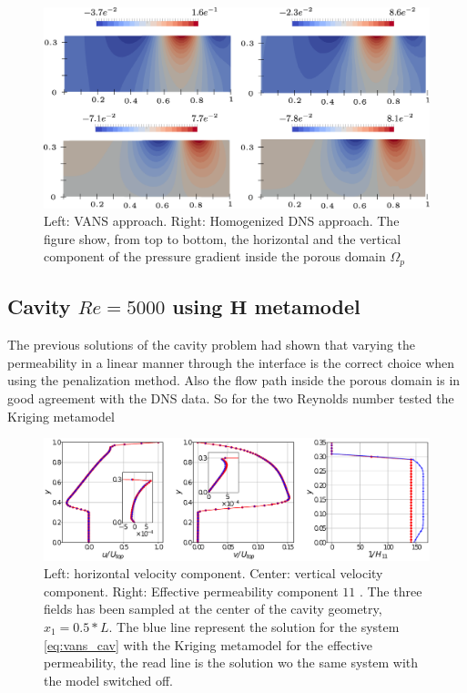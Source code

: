 \begin{figure}[h]
	\centering
	\includegraphics[width=1\linewidth]{chapter_5/figure/re1000/vans_p}
	\caption{Left: VANS approach. Right: Homogenized DNS approach. The figure show, from top to bottom, the horizontal and the vertical component of the pressure gradient inside the porous domain $\Omega_p$}
	\label{fig:1000_p}
\end{figure}


\subsection{Cavity $Re=5000$ using $\mathbf{H}$ metamodel}
\label{pr:mata_cav}

The previous solutions of the cavity problem had shown that varying the permeability in a linear manner through the interface is the correct choice when using the penalization method. Also the flow path inside the porous domain is in good agreement with the DNS data. So for the two Reynolds number tested the Kriging metamodel 

\begin{figure}[h]
	\centering
	\includegraphics[width=0.9\linewidth]{chapter_5/figure/cav_5000}
	\caption{Left: horizontal velocity component. Center: vertical velocity component. Right: Effective permeability component $11$ . The three fields has been sampled at the center of the cavity geometry, $x_1=0.5*L$. The blue line represent the solution for the system \eqref{eq:vans_cav} with the Kriging metamodel for the effective permeability, the read line is the solution wo the same system with the model switched off.}
	\label{fig:cav5000}
\end{figure}

